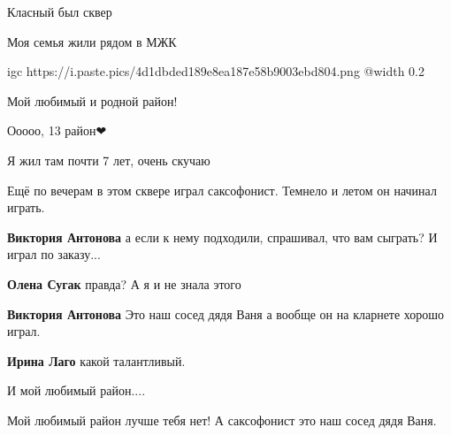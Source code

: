  
 
 
 
 

\qqSecCmt


Класный был сквер


Моя семья жили рядом в МЖК


\ifcmt
  igc https://i.paste.pics/4d1dbded189e8ea187e58b9003ebd804.png
	@width 0.2
\fi


Мой любимый и родной район!


Ооооо, 13 район❤


Я жил там почти 7 лет, очень скучаю


Ещё по вечерам в этом сквере играл саксофонист. Темнело и летом он начинал играть.

\begin{itemize} %
\textbf{Виктория Антонова} а если к нему подходили, спрашивал, что вам сыграть? И играл по заказу...

\textbf{Олена Сугак} правда? А я и не знала этого

\textbf{Виктория Антонова} Это наш сосед дядя Ваня а вообще он на кларнете хорошо играл.

\textbf{Ирина Лаго} какой талантливый.
\end{itemize} %


И мой любимый район....


Мой любимый район лучше тебя нет! А саксофонист это наш сосед дядя Ваня.
